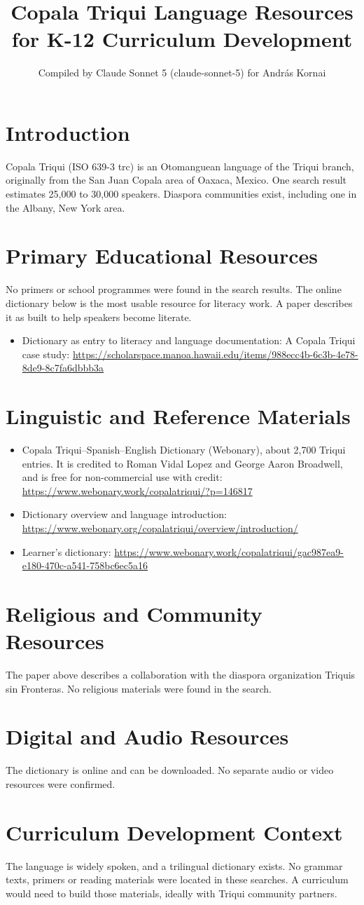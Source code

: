 \documentclass[12pt]{article}
\title{Copala Triqui Language Resources for K-12 Curriculum Development}
\author{Compiled by Claude Sonnet 5 (claude-sonnet-5) for Andr\'as Kornai}
\date{}
\begin{document}
\maketitle
\section{Introduction}
Copala Triqui (ISO 639-3 trc) is an Otomanguean language of the Triqui branch, originally from the San Juan Copala area of Oaxaca, Mexico. One search result estimates 25,000 to 30,000 speakers. Diaspora communities exist, including one in the Albany, New York area.
\section{Primary Educational Resources}
No primers or school programmes were found in the search results. The online dictionary below is the most usable resource for literacy work. A paper describes it as built to help speakers become literate.
\begin{itemize}
\item Dictionary as entry to literacy and language documentation: A Copala Triqui case study: \url{https://scholarspace.manoa.hawaii.edu/items/988ecc4b-6c3b-4e78-8de9-8c7fa6dbbb3a}
\end{itemize}
\section{Linguistic and Reference Materials}
\begin{itemize}
\item Copala Triqui--Spanish--English Dictionary (Webonary), about 2,700 Triqui entries. It is credited to Roman Vidal Lopez and George Aaron Broadwell, and is free for non-commercial use with credit: \url{https://www.webonary.work/copalatriqui/?p=146817}
\item Dictionary overview and language introduction: \url{https://www.webonary.org/copalatriqui/overview/introduction/}
\item Learner's dictionary: \url{https://www.webonary.work/copalatriqui/gac987ea9-e180-470c-a541-758bc6ec5a16}
\end{itemize}
\section{Religious and Community Resources}
The paper above describes a collaboration with the diaspora organization Triquis sin Fronteras. No religious materials were found in the search.
\section{Digital and Audio Resources}
The dictionary is online and can be downloaded. No separate audio or video resources were confirmed.
\section{Curriculum Development Context}
The language is widely spoken, and a trilingual dictionary exists. No grammar texts, primers or reading materials were located in these searches. A curriculum would need to build those materials, ideally with Triqui community partners.
\end{document}
